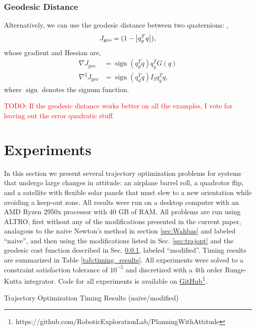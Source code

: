 \documentclass[letterpaper, 10 pt, conference]{ieeeconf}  %
\DeclareMathOperator{\sign}{sign}
\newcommand{\todo}[1]{\textcolor{red}{TODO: #1}}
\begin{document}
        \subsubsection{Geodesic Distance} \label{sec:geodesic}
            Alternatively, we can use the geodesic distance between two quaternions:
            \cite{Kuffner2004},
            \begin{equation} \label{eq:quat_geodesic}
                J_\text{geo} = (1-\abs{q_g^T q}) ,
            \end{equation}
            whose gradient and Hessian are,
            \begin{align}
                \nabla J_\text{geo} &= \sign(q_d^T q) q_g^T G(q) \\
                \nabla^2 J_\text{geo} &= \sign(q_d^T q) I_3 q_g^T q ,
            \end{align}
where $\sign$ denotes the signum function.

\todo{If the geodesic distance works better on all the examples, I vote for leaving out the error quadratic stuff.}

\section{Experiments} \label{sec:experiments}
    In this section we present several trajectory optimization problems for systems that
    undergo large changes in attitude: an airplane barrel roll, a quadrotor flip, and a
    satellite with flexible solar panels that must slew to a new orientation while avoiding a 
    keep-out zone. All results were run on a desktop computer with an 
    AMD Ryzen 2950x processor with 40 GB of RAM. 
    All problems are run using ALTRO, first without any of the modifications presented 
    in the current paper, analagous to the naive Newton's method in section \ref{sec:Wahbas} and labeled ``naive'', and then using the modifications listed
    in Sec. \ref{sec:trajopt} and the geodesic cost function described in Sec. \ref{sec:geodesic},
    labeled ``modified''.
    Timing results are summarized in Table \ref{tab:timing_results}.
    All experiments were solved to a constraint satisfaction tolerance of $10^{-5}$ and 
    discretized with a 4th order Runge-Kutta integrator.
    Code for all experiments is available on 
    \href{https://github.com/RoboticExplorationLab/PlanningWithAttitude}
    {GitHub\footnote{\url{https://github.com/RoboticExplorationLab/PlanningWithAttitude}}}.

    \begin{table}
        \centering
        
        \label{tab:timing_results}
        \caption{Trajectory Optimization Timing Results (naive/modified)}
    \end{table}
        
\end{document}
